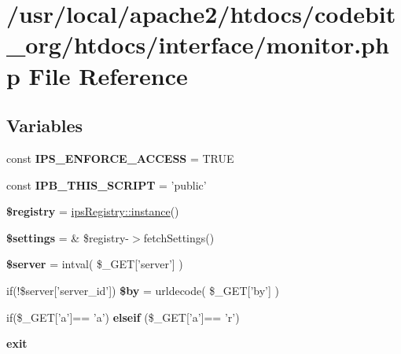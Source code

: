 \hypertarget{monitor_8php}{\section{/usr/local/apache2/htdocs/codebit\-\_\-org/htdocs/interface/monitor.php File Reference}
\label{monitor_8php}
}
\subsection*{Variables}
\begin{DoxyCompactItemize}
\item 
\hypertarget{monitor_8php_a80c7e2a07f828a55d6ba3f2f18060d17}{const {\bfseries I\-P\-S\-\_\-\-E\-N\-F\-O\-R\-C\-E\-\_\-\-A\-C\-C\-E\-S\-S} = T\-R\-U\-E}\label{monitor_8php_a80c7e2a07f828a55d6ba3f2f18060d17}

\item 
\hypertarget{monitor_8php_ad8356f086468696f258f1950da81003a}{const {\bfseries I\-P\-B\-\_\-\-T\-H\-I\-S\-\_\-\-S\-C\-R\-I\-P\-T} = 'public'}\label{monitor_8php_ad8356f086468696f258f1950da81003a}

\item 
\hypertarget{monitor_8php_a531e4a386aaa7f3e06d3642dc38d7e80}{{\bfseries \$registry} = \hyperlink{classips_registry_a0deb004950b8dc4f51836316fd19c111}{ips\-Registry\-::instance}()}\label{monitor_8php_a531e4a386aaa7f3e06d3642dc38d7e80}

\item 
\hypertarget{monitor_8php_ac7c3353107070daa85f641882931b358}{{\bfseries \$settings} = \& \$registry-\/$>$fetch\-Settings()}\label{monitor_8php_ac7c3353107070daa85f641882931b358}

\item 
\hypertarget{monitor_8php_ad135cc8a47e55f0829949cf62214170f}{{\bfseries \$server} = intval( \$\-\_\-\-G\-E\-T\mbox{[}'server'\mbox{]} )}\label{monitor_8php_ad135cc8a47e55f0829949cf62214170f}

\item 
\hypertarget{monitor_8php_a0e4707d6f6b6d11f9753342f4f2eece9}{if(!\$server\mbox{[}'server\-\_\-id'\mbox{]}) {\bfseries \$by} = urldecode( \$\-\_\-\-G\-E\-T\mbox{[}'by'\mbox{]} )}\label{monitor_8php_a0e4707d6f6b6d11f9753342f4f2eece9}

\item 
\hypertarget{monitor_8php_a44656cdf0604da7ec4029f5098d9f127}{if(\$\-\_\-\-G\-E\-T\mbox{[}'a'\mbox{]}== 'a') {\bfseries elseif} (\$\-\_\-\-G\-E\-T\mbox{[}'a'\mbox{]}== 'r')}\label{monitor_8php_a44656cdf0604da7ec4029f5098d9f127}

\item 
\hypertarget{monitor_8php_a6733eb5f605d09eaede9845835d71c4e}{{\bfseries exit}}\label{monitor_8php_a6733eb5f605d09eaede9845835d71c4e}

\end{DoxyCompactItemize}


